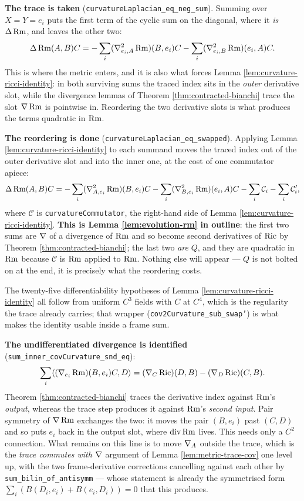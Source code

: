 \begin{lemma}
  \textbf{The trace is taken} (\texttt{curvatureLaplacian\_eq\_neg\_sum}). Summing
  over $X = Y = e_i$ puts the first term of the cyclic sum on the diagonal, where
  it \emph{is} $\Delta\operatorname{Rm}$, and leaves the other two:
  \[
    \Delta\operatorname{Rm}(A,B)C = -\sum_i (\nabla^2_{e_i,A}\operatorname{Rm})(B,e_i)C
      - \sum_i (\nabla^2_{e_i,B}\operatorname{Rm})(e_i,A)C .
  \]
  This is where the metric enters, and it is also what forces
  Lemma \ref{lem:curvature-ricci-identity}: in both surviving sums the traced
  index sits in the \emph{outer} derivative slot, while the divergence lemmas of
  Theorem \ref{thm:contracted-bianchi} trace the slot $\nabla\operatorname{Rm}$ is pointwise in.
  Reordering the two derivative slots is what produces the terms quadratic
  in $\operatorname{Rm}$.

  \textbf{The reordering is done} (\texttt{curvatureLaplacian\_eq\_swapped}).
  Applying Lemma \ref{lem:curvature-ricci-identity} to each summand moves the
  traced index out of the outer derivative slot and into the inner one, at the
  cost of one commutator apiece:
  \[
    \Delta\operatorname{Rm}(A,B)C = -\sum_i (\nabla^2_{A,e_i}\operatorname{Rm})(B,e_i)C
      - \sum_i (\nabla^2_{B,e_i}\operatorname{Rm})(e_i,A)C - \sum_i \mathcal{C}_i - \sum_i \mathcal{C}'_i,
  \]
  where $\mathcal{C}$ is \texttt{curvatureCommutator}, the right-hand side of
  Lemma \ref{lem:curvature-ricci-identity}. \textbf{This is
  Lemma \ref{lem:evolution-rm} in outline}: the first two sums are $\nabla$ of a
  divergence of $\operatorname{Rm}$ and so become second derivatives of $\operatorname{Ric}$ by
  Theorem \ref{thm:contracted-bianchi}; the last two \emph{are} $Q$, and they are
  quadratic in $\operatorname{Rm}$ because $\mathcal{C}$ is $\operatorname{Rm}$ applied to $\operatorname{Rm}$. Nothing else
  will appear --- $Q$ is not bolted on at the end, it is precisely what the
  reordering costs.

  The twenty-five differentiability hypotheses of
  Lemma \ref{lem:curvature-ricci-identity} all follow from uniform $C^3$ fields
  with $C$ at $C^4$, which is the regularity the trace already carries; that
  wrapper (\texttt{cov2Curvature\_sub\_swap'}) is what makes the identity usable
  inside a frame sum.

  \textbf{The undifferentiated divergence is identified}
  (\texttt{sum\_inner\_covCurvature\_snd\_eq}):
  \[
    \sum_i \langle (\nabla_{e_i}\operatorname{Rm})(B,e_i)C, D\rangle
      = (\nabla_C\operatorname{Ric})(D,B) - (\nabla_D\operatorname{Ric})(C,B).
  \]
  Theorem \ref{thm:contracted-bianchi} traces the derivative index against
  $\operatorname{Rm}$'s \emph{output}, whereas the trace step produces it against $\operatorname{Rm}$'s
  \emph{second input}. Pair symmetry of $\nabla\operatorname{Rm}$ exchanges the two: it moves the
  pair $(B,e_i)$ past $(C,D)$ and so puts $e_i$ back in the output slot, where
  $\operatorname{div}\operatorname{Rm}$ lives. This needs only a $C^2$ connection. What remains
  on this line is to move $\nabla_A$ outside the trace, which is the
  \emph{trace commutes with $\nabla$} argument of Lemma \ref{lem:metric-trace-cov} one
  level up, with the two frame-derivative corrections cancelling against each
  other by \texttt{sum\_bilin\_of\_antisymm} --- whose statement is already the
  symmetrised form $\sum_i (B(D_i,e_i) + B(e_i,D_i)) = 0$ that this produces.


\end{lemma}
